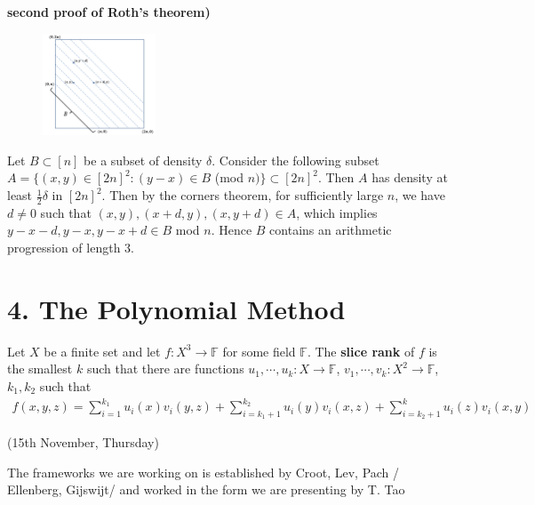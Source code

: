 \documentclass[12pt,a4paper]{report}
\newenvironment{proof}
{\begin{changemargin}{1cm}{0.5cm}
	}%
	{\end{changemargin}
}
\begin{document}
\begin{proof}
\textbf{second proof of Roth's theorem)}
\begin{figure}[h]
	\centering
	\includegraphics[width=0.3\textwidth]{4}
\end{figure}
Let $B \subset [n]$ be a subset of density $\delta$. Consider the following subset $A = \{(x,y) \in [2n]^2 : (y-x) \in B$ (mod $n) \}\subset [2n]^2$. Then $A$ has density at least $\frac{1}{2}\delta$ in $[2n]^2$. Then by the corners theorem, for sufficiently large $n$, we have $d\neq 0$ such that $(x,y), (x+d,y),(x,y+d) \in A$, which implies $y-x-d,y-x,y-x+ d\in B$ mod $n$. Hence $B$ contains an arithmetic progression of length 3.

\eop
\end{proof}

\section*{4. The Polynomial Method}

Let $X$ be a finite set and let $f: X^3 \rightarrow \mathbb{F}$ for some field $\mathbb{F}$. The \textbf{slice rank} of $f$ is the smallest $k$ such that there are functions $u_1, \cdots, u_k : X\rightarrow \mathbb{F}$, $v_1, \cdots, v_k : X^2 \rightarrow \mathbb{F}$, $k_1, k_2$ such that
\begin{align*}
f(x,y,z) = \sum_{i=1}^{k_1} u_i (x) v_i(y,z) + \sum_{i=k_1+1}^{k_2}u_i(y) v_i(x,z) + \sum_{i=k_2+1}^k u_i(z) v_i(x,y)
\end{align*}
\s

\newday

(15th November, Thursday)
\s

The frameworks we are working on is established by Croot, Lev, Pach / Ellenberg, Gijswijt/ and worked in the form we are presenting by T. Tao
\s
\end{document}
